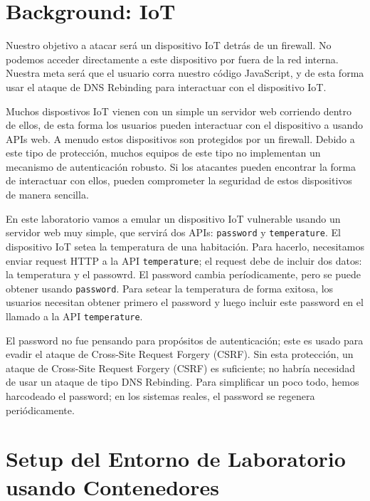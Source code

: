\section{Background: IoT}

Nuestro objetivo a atacar será un dispositivo IoT detrás de un firewall. No podemos acceder directamente a este dispositivo por fuera de la red interna. Nuestra meta será que el usuario corra nuestro código JavaScript, y de esta forma usar el ataque de DNS Rebinding para interactuar con el dispositivo IoT.

Muchos dispostivos IoT vienen con un simple un servidor web corriendo dentro de ellos, de esta forma los usuarios pueden interactuar con el dispositivo a usando APIs web. A menudo estos dispositivos son protegidos por un firewall. Debido a este tipo de protección, muchos equipos de este tipo no implementan un mecanismo de autenticación robusto. Si los atacantes pueden encontrar la forma de interactuar con ellos, pueden comprometer la seguridad de estos dispositivos de manera sencilla.

En este laboratorio vamos a emular un dispositivo IoT vulnerable usando un servidor web muy simple, que servirá dos APIs:  \texttt{password} y \texttt{temperature}.
El dispositivo IoT setea la temperatura de una habitación. Para hacerlo, necesitamos enviar request HTTP a la API \texttt{temperature}; el request debe de incluir dos datos: la temperatura y el passowrd.
El password cambia períodicamente, pero se puede obtener usando \texttt{password}. Para setear la temperatura de forma exitosa, los usuarios necesitan obtener primero el password y luego incluir este password en el llamado a la API \texttt{temperature}.

El password no fue pensando para propósitos de autenticación; este es usado para evadir el ataque de Cross-Site Request Forgery (CSRF). Sin esta protección, un ataque de Cross-Site
Request Forgery (CSRF) es suficiente; no habría necesidad de usar un ataque de tipo DNS Rebinding.
Para simplificar un poco todo, hemos harcodeado el password; en los sistemas reales, el password se regenera periódicamente.



\section{Setup del Entorno de Laboratorio usando Contenedores}



